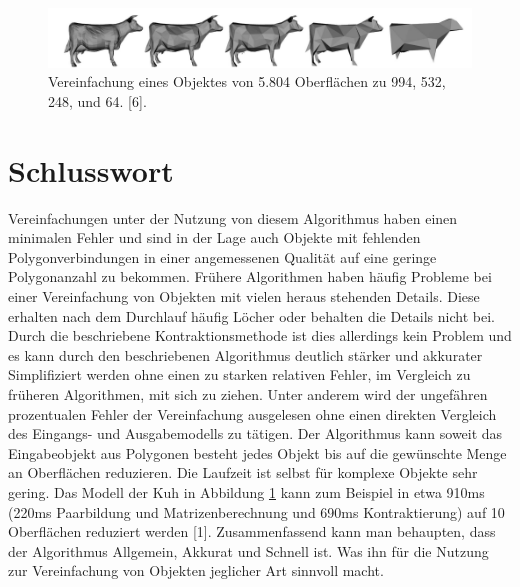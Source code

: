 \documentclass[runningheads]{llncs}
\begin{document}
    \begin{figure}[ht]
	\centering
	\includegraphics[width=1\textwidth]{Vereinfachung.png}
	\caption{Vereinfachung eines Objektes von 5.804 Oberflächen zu 994, 532, 248, und 64. [6].}
	\label{fig:Vereinfachung}
    \end{figure}

\section{Schlusswort}
Vereinfachungen unter der Nutzung von diesem Algorithmus haben einen minimalen Fehler und sind in der Lage auch Objekte mit fehlenden Polygonverbindungen in einer angemessenen Qualität auf eine geringe Polygonanzahl zu bekommen.\newline
Frühere Algorithmen haben häufig Probleme bei einer Vereinfachung von Objekten mit vielen heraus stehenden Details. Diese erhalten nach dem Durchlauf häufig Löcher oder behalten die Details nicht bei. \newline
Durch die beschriebene Kontraktionsmethode ist dies allerdings kein Problem und es kann durch den beschriebenen Algorithmus deutlich stärker und akkurater Simplifiziert werden ohne einen zu starken relativen Fehler, im Vergleich zu früheren Algorithmen, mit sich zu ziehen.\newline
Unter anderem wird der ungefähren prozentualen Fehler der Vereinfachung ausgelesen ohne einen direkten Vergleich des Eingangs- und Ausgabemodells zu tätigen.
Der Algorithmus kann soweit das Eingabeobjekt aus Polygonen besteht jedes Objekt bis auf die gewünschte Menge an Oberflächen reduzieren.\newline
Die Laufzeit ist selbst für komplexe Objekte sehr gering.\newline
Das Modell der Kuh in Abbildung \ref{fig:Vereinfachung} kann zum Beispiel in etwa 910ms (220ms Paarbildung und Matrizenberechnung und 690ms Kontraktierung) auf 10 Oberflächen reduziert werden [1].\newline
Zusammenfassend kann man behaupten, dass der Algorithmus Allgemein, Akkurat und Schnell ist. Was ihn für die Nutzung zur Vereinfachung von Objekten jeglicher Art sinnvoll macht.
\end{document}
